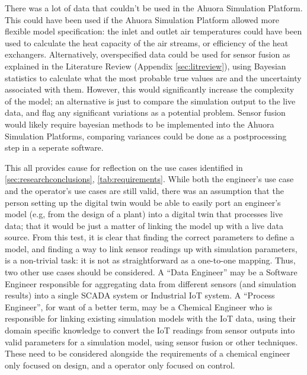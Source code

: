 There was a lot of data that couldn't be used in the Ahuora Simulation Platform. This could have been used if the Ahuora Simulation Platform allowed more flexible model specification: the inlet and outlet air temperatures could have been used to calculate the heat capacity of the air streams, or efficiency of the heat exchangers.
Alternatively, overspecified data could be used for sensor fusion as explained in the Literature Review (Appendix \ref{sec:litreview}), using Bayesian statistics to calculate what the most probable true values are and the uncertainty associated with them. 
However, this would significantly increase the complexity of the model; an alternative is just to compare the simulation output to the live data, and flag any significant variations as a potential problem. 
Sensor fusion would likely require bayesian methods to be implemented into the Ahuora Simulation Platforms, comparing variances could be done as a postprocessing step in a seperate software.

This all provides cause for reflection on the use cases identified in \cref{sec:researchconclusions}, \cref{tab:requirements}. While both the engineer's use case and the operator's use cases are still valid, there was an assumption that the person setting up the digital twin would be able to easily port an engineer's model (e.g, from the design of a plant) into a digital twin that processes live data; that it would be just a matter of linking the model up with a live data source. From this test, it is clear that finding the correct parameters to define a model, and finding a way to link sensor readings up with simulation parameters, is a non-trivial task: it is not as straightforward as a one-to-one mapping. Thus, two other use cases should be considered. A ``Data Engineer'' may be a Software Engineer responsible for aggregating data from different sensors (and simulation results) into a single SCADA system or Industrial IoT system. A ``Process Engineer'', for want of a better term, may be a Chemical Engineer who is responsible for linking existing simulation models with the IoT data, using their domain specific knowledge to convert the IoT readings from sensor outputs into valid parameters for a simulation model, using sensor fusion or other techniques. These need to be considered alongside the requirements of a chemical engineer only focused on design, and a operator only focused on control.

